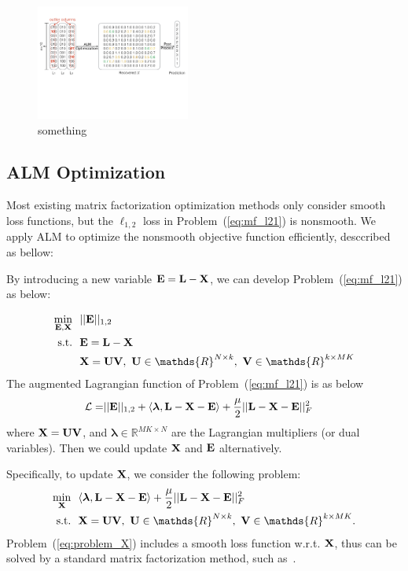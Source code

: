 \documentclass[letterpaper]{article}
\def\bE{{\bf E}}
\def\blambda{{\bm \lambda}}
\def\calL{{\mathcal{L}}}
\def\bL{{\bf L}}
\def\bU{{\bf U}}
\def\bV{{\bf V}}
\def\dsR{\mathds{R}}
\def\bX{{\bf X}}
\def\bX{{\bf X}}
\def\st{{\text{s.t.}}}
\begin{document}
\begin{figure}[h]
\centering\includegraphics[width=0.45\textwidth]{resource/frame_work.pdf}
\caption{something}\label{fig:framework}
\end{figure}


\subsection{ALM Optimization}
Most existing matrix factorization optimization methods only consider smooth loss functions, but the $\ell_{1,2}$ loss in Problem~(\ref{eq:mf_l21}) is nonsmooth.
We apply ALM to optimize the nonsmooth objective function efficiently, desccribed as bellow:

By introducing a new variable $\bE = \bL - \bX$, we can develop Problem~(\ref{eq:mf_l21}) as below:

\begin{align}\label{eq:mf_l21_constrained}
  \min_{\bE, \bX} ~&~ || \bE ||_{1,2}   \nonumber \\
  \st             ~&~ \bE = \bL - \bX   \nonumber \\
                  ~&~ \bX = \bU \bV,~\bU \in \dsR^{N \times k},~\bV \in \dsR^{k \times MK}
\end{align}
The augmented Lagrangian function of Problem~(\ref{eq:mf_l21}) is as below
\begin{align}\label{eq:lagrangian_l21}
  \calL = & || \bE ||_{1,2} + \langle \blambda, \bL - \bX - \bE \rangle + \frac{\mu}{2} || \bL - \bX - \bE ||_F^2
\end{align}
\noindent
where $\bX = \bU \bV$,
and $\blambda \in \dsR^{MK \times N}$ are the Lagrangian multipliers (or dual variables).
Then we could update $\bX$ and $\bE$ alternatively.


Specifically, to update $\bX$, we consider the following problem:
\begin{align}\label{eq:problem_X}
  \min_{\bX} ~&~ \langle \blambda, \bL - \bX - \bE \rangle + \frac{\mu}{2} || \bL - \bX - \bE ||_F^2  \nonumber  \\
  \st        ~&~ \bX = \bU \bV,~\bU \in \dsR^{N \times k},~\bV \in \dsR^{k \times MK}   .
\end{align}
Problem~(\ref{eq:problem_X}) includes a smooth loss function w.r.t. $\bX$, thus can be solved by a standard matrix factorization method, such as~\cite{yanijcai2015scalable,tanicml2014riemannian,vandereyckensiamjo2013low}.
\end{document}
